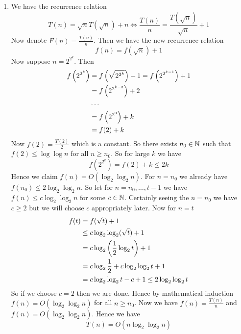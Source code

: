 \documentclass[a4paper, 11pt]{article}
\begin{document}
{\begin{enumerate}[label=(\roman*)]
So we claim $T(n)=(T(1)+c)n^2$ for some $c\geq 2$ and $n\geq n_0$ where $n_0\in\bbN$. So take $n_0=3$. Then $T(3)=7T(1)+9\leq 9T(1)+18\times 9=(T(1)+c)9$. Hence this follows for the base case. Now suppose $T(n)=(T(1)+c)n^2$ for all $n=3,\dots, k-1$. Then for $n=k$ $$T(k)=7T\lt(\frac{k}3\rt)+k^2\leq 7(T(1)+c)\frac{k^2}{3^2}+k^2=k^2\lt(\frac{7(T(1)+c)}{9}+1\rt)$$We want $$\frac{7(T(1)+c)}{9}+1\leq T(1)+c\iff7(T(1)+c)+1\leq 9(T(1)+c)\iff 1\leq 2(c+T(1))$$ this is indeed true since $c\geq 2$. Hence we have $T(k)\leq (c+T(1))k^2$. Hence by mathematical induction we have $T(n)\leq (c+T(1))n^2$ for all $n\geq 4$ with $n\in\bbN$. Now $(c+T(1))n^2=O(n^2)$. Hence $T(n)=O(n^2)$.
		\item We have the recurrence relation $$T(n)=\sqrt{n}T(\sqrt{n})+n\iff \frac{T(n)}{n}=\frac{T(\sqrt{n})}{\sqrt{n}}+1$$Now denote $F(n)=\frac{T(n)}{n}$. Then we have the new recurrence relation $$f(n)=f(\sqrt{n})+1$$Now suppose $n=2^{2^k}$. Then\begin{align*}
			f\left(2^{2^k}\right)
			&= f\left(\sqrt{2^{2^k}}\right)+1 = f\left(2^{2^{k-1}}\right) + 1 \\
			&= f\left(2^{2^{k-2}}\right) + 2 \\
			& \cdots \\
			&=f\left(2^{2^0}\right) + k \\
			& = f(2) + k
		\end{align*}
		Now $f(2)=\frac{T(2)}2$ which is a constant. So there exists $n_0\in\bbN$ such that $f(2)\leq \log\log n$ for all $n\geq n_0$. So for large $k$ we have $$f\left(2^{2^k}\right)=f(2)+k\leq 2k$$Hence we claim $f(n)=O(\log_2\log_2 n)$. For $n=n_0$ we already have $f(n_0)\leq 2\log_2\log_2n$. So let for $n=n_0,\dots, t-1$ we have $f(n)\leq c\log_2\log_2n$ for some $c\in \mathbb{N}$. Certainly seeing the $n=n_0$ we have $c\geq 2$ but we will choose $c$ appropriately later. Now for $n=t$ \begin{align*}
			f(t)&=f(\sqrt{t})+1\\
			& \leq  c\log_2\log_2(\sqrt{t})+1\\
			&=c\log_2 \left(\frac12\log_2 t\right)+1\\
			& =c\log_2\frac12+c\log_2\log_2t+1\\
			& = c\log_2\log_2t-c+1\leq 2\log_2\log_2t
		\end{align*}
	So if we choose $c= 2$ then we are done. Hence by mathematical induction $f(n)=O(\log_2\log_2 n)$ for all $n\geq n_0$. Now we have $f(n)=\frac{T(n)}n$ and $f(n)=O(\log_2\log_2n)$. Hence we have $$T(n)=O(n\log_2\log_2 n)$$
	\end{enumerate}
}
\end{document}
